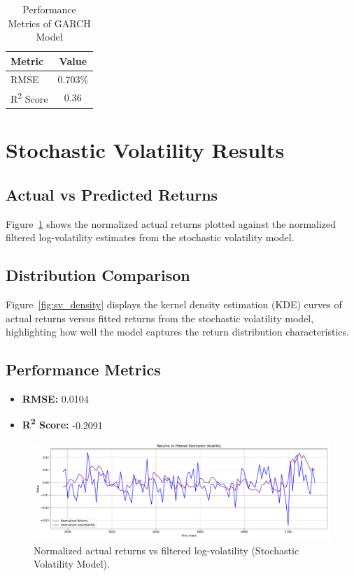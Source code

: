 \begin{table}[h!]
\centering
\caption{Performance Metrics of GARCH Model}
\label{tab:garch_performance}
\begin{tabular}{|l|c|}
\hline
\textbf{Metric}   & \textbf{Value}  \\ \hline
RMSE              & 0.703\%  \\ \hline
R\textsuperscript{2} Score & 0.36  \\ \hline
\end{tabular}
\end{table}


\section{Stochastic Volatility Results}
\subsection{Actual vs Predicted Returns}
Figure~\ref{fig:sv_actual_vs_pred} shows the normalized actual returns plotted against the normalized filtered log-volatility estimates from the stochastic volatility model.

\subsection{Distribution Comparison}
Figure~\ref{fig:sv_density} displays the kernel density estimation (KDE) curves of actual returns versus fitted returns from the stochastic volatility model, highlighting how well the model captures the return distribution characteristics.

\subsection{Performance Metrics}
\begin{itemize}
    \item \textbf{RMSE:} 0.0104
    \item \textbf{R\textsuperscript{2} Score:} -0.2091
\end{itemize}

\begin{figure}[h!]
    \centering
    \includegraphics[width=\textwidth]{Images/stochastic_volatility.pdf}
    \caption{Normalized actual returns vs filtered log-volatility (Stochastic Volatility Model).}
    \label{fig:sv_actual_vs_pred}
\end{figure}

